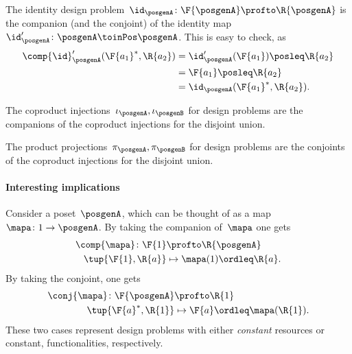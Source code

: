 \begin{example}
    The identity design problem~$\id_\posgenA\colon \F{\posgenA} \profto \R{\posgenA}$ is the companion (and the conjoint) of the identity map~$\id_\posgenA'\colon \posgenA \toinPos \posgenA$.
    This is easy to check, as
    \begin{equation}
        \begin{aligned}
            \comp{\id}_\posgenA'(\F{a_1}^*,\R{a_2})&=\id_\posgenA'(\F{a_1})\posleq \R{a_2}\\
            &=\F{a_1}\posleq \R{a_2}\\
            &=\id_\posgenA(\F{a_1}^*,\R{a_2}).
        \end{aligned}
    \end{equation}
\end{example}

\begin{example}
    The coproduct injections~$\iota_\posgenA, \iota_\posgenB$ for design problems are the companions of the coproduct injections for the disjoint union.
\end{example}

\begin{example}
    The product projections~$\pi_\posgenA, \pi_\posgenB$ for design problems are the conjoints of the coproduct injections for the disjoint union.
\end{example}

\paragraph{Interesting implications}
Consider a poset~$\posgenA$, which can be thought of as a map~$\mapa \colon 1\to \posgenA$. By taking the companion of~$\mapa$ one gets
\begin{equation}
    \begin{aligned}
        \comp{\mapa}\colon \F{1}&\profto \R{\posgenA}\\
        \tup{\F{1},\R{a}}&\mapsto \mapa(1)\ordleq \R{a}.
    \end{aligned}
\end{equation}
By taking the conjoint, one gets
\begin{equation}
    \begin{aligned}
        \conj{\mapa}\colon \F{\posgenA}&\profto \R{1}\\
        \tup{\F{a}^*,\R{1}}&\mapsto \F{a}\ordleq \mapa(\R{1}).
    \end{aligned}
\end{equation}
These two cases represent design problems with either \emph{constant} resources or constant, functionalities, respectively.